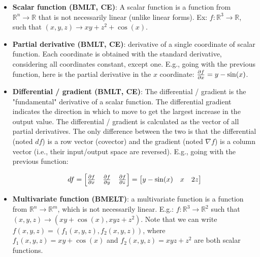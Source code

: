 \documentclass{article}
\begin{document}
\begin{itemize}

	\item \textbf{Scalar function (BMLT, CE)}: A scalar function is a function from $\mathbb{R}^n \rightarrow \mathbb{R}$ that is not necessarily linear (unlike linear forms). Ex: $f : \mathbb{R}^3 \rightarrow \mathbb{R}$, such that $(x, y, z) \rightarrow xy + z^2 + \cos(x)$.

	\item \textbf{Partial derivative (BMLT, CE)}: derivative of a single coordinate of scalar function. Each coordinate is obtained with the standard derivative, considering all coordinates constant, except one. E.g., going with the previous function, here is the partial derivative in the $x$ coordinate: $\pdv{f}{x} = y - \sin(x)$.

	\item \textbf{Differential / gradient (BMLT, CE)}: The differential / gradient is the "fundamental" derivative of a scalar function. The differential gradient indicates the direction in which to move to get the largest increase in the output value. The differential / gradient is calculated as the vector of all partial derivatives. The only difference between the two is that the differential (noted $df$) is a row vector (covector) and the gradient (noted $\nabla f$) is a column vector (i.e., their input/output space are reversed). E.g., going with the previous function:

	\begin{align*}
		df
		=
		\begin{bmatrix}
			\pdv{f}{x} & \pdv{f}{y} & \pdv{f}{z}
		\end{bmatrix}
		=
		\begin{bmatrix}
			y - \sin(x) & x & 2z
		\end{bmatrix}
	\end{align*}

	\item \textbf{Multivariate function (BMELT)}: a multivariate function is a function from $\mathbb{R}^n \rightarrow \mathbb{R}^m$, which is not necessarily linear. E.g.: $f : \mathbb{R}^3 \rightarrow \mathbb{R}^2$ such that $(x,y,z) \rightarrow (xy + \cos(x), xyz + z^2)$. Note that we can write $f(x,y,z) = (f_1(x,y,z), f_2(x,y,z))$, where $f_1(x,y,z) = xy + \cos(x)$ and $f_2(x,y,z) = xyz + z^2$ are both scalar functions.


\end{itemize}
\end{document}
